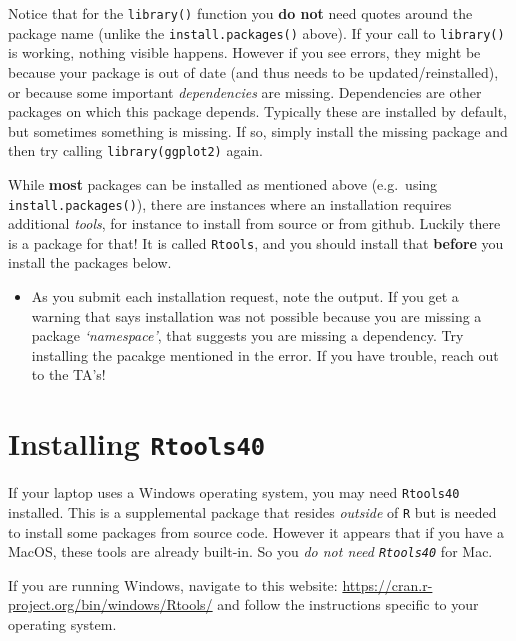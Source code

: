 \documentclass[
]{book}
\newcommand{\passthrough}[1]{#1}
\newenvironment{rmdblock}[1]
  {%
  \begin{itemize}
  \renewcommand{\labelitemi}{
    \raisebox{-.7\height}[0pt][0pt]{
      {\setkeys{Gin}{width=3em,keepaspectratio}\texttt{[image: images/\#1]}}
    }
  }
  \item
  }
  {
  \end{itemize}
  }
\newenvironment{rmdcaution}
  {\begin{rmdblock}{caution}}
  {\end{rmdblock}}
\begin{document}
Notice that for the \passthrough{\lstinline!library()!} function you \textbf{do not} need quotes around the package name (unlike the \passthrough{\lstinline!install.packages()!} above). If your call to \passthrough{\lstinline!library()!} is working, nothing visible happens. However if you see errors, they might be because your package is out of date (and thus needs to be updated/reinstalled), or because some important \emph{dependencies} are missing. Dependencies are other packages on which this package depends. Typically these are installed by default, but sometimes something is missing. If so, simply install the missing package and then try calling \passthrough{\lstinline!library(ggplot2)!} again.

While \textbf{most} packages can be installed as mentioned above (e.g.~using \passthrough{\lstinline!install.packages()!}), there are instances where an installation requires additional \emph{tools}, for instance to install from source or from github. Luckily there is a package for that! It is called \passthrough{\lstinline!Rtools!}, and you should install that \textbf{before} you install the packages below.

\begin{rmdcaution}
As you submit each installation request, note the output. If you get a warning that says installation was not possible because you are missing a package \emph{`namespace'}, that suggests you are missing a dependency. Try installing the pacakge mentioned in the error. If you have trouble, reach out to the TA's!
\end{rmdcaution}

\hypertarget{installing-rtools40}{%
\section*{\texorpdfstring{Installing \texttt{Rtools40}}{Installing Rtools40}}\label{installing-rtools40}}

If your laptop uses a Windows operating system, you may need \passthrough{\lstinline!Rtools40!} installed. This is a supplemental package that resides \emph{outside} of \passthrough{\lstinline!R!} but is needed to install some packages from source code. However it appears that if you have a MacOS, these tools are already built-in. So you \emph{do not need \passthrough{\lstinline!Rtools40!}} for Mac.

If you are running Windows, navigate to this website: \url{https://cran.r-project.org/bin/windows/Rtools/} and follow the instructions specific to your operating system.
\end{document}
